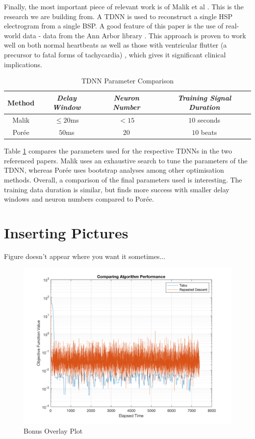 \documentclass[10pt,a4paper,conference]{IEEEtran}
\begin{document}
Finally, the most important piece of relevant work is of Malik et al \cite{Malik2018}. This is the research we are building from. A TDNN is used to reconstruct a single HSP electrogram from a single BSP. A good feature of this paper is the use of real-world data - data from the Ann Arbor library \cite{AnnArbor}. This approach is proven to work well on both normal heartbeats as well as those with ventricular flutter (a precursor to fatal forms of tachycardia) \cite{Malik2018}, which gives it significant clinical implications.


\begin{table}[t]
\centering
\caption{TDNN Parameter Comparison}
\label{table:hi}
\begin{tabular}{|c|c|c|c|}
\hline
\textbf{Method} & \textbf{\textit{Delay Window}}& \textbf{\textit{Neuron Number}}& \textbf{\textit{Training Signal Duration}} \\
\hline
Malik & $\leq20$ms & $<15$ & $10$ seconds  \\
\hline
Por\'ee & $50$ms & $20$ & $10$ beats  \\
\hline
\end{tabular}
\end{table}



Table \ref{table:hi} compares the parameters used for the respective TDNNs in the two referenced papers. Malik uses an exhaustive search to tune the parameters of the TDNN, whereas Por\'ee uses bootstrap analyses among other optimisation methods. Overall, a comparison of the final parameters used is interesting. The training data duration is similar, but \cite{Malik2018} finds more success with smaller delay windows and neuron numbers compared to Por\'ee.

\section{Inserting Pictures}

Figure doesn't appear where you want it sometimes...
\begin{figure}
  \includegraphics[width=\linewidth]{plots/bonus.png}
  \caption{Bonus Overlay Plot}
\end{figure}
\end{document}
